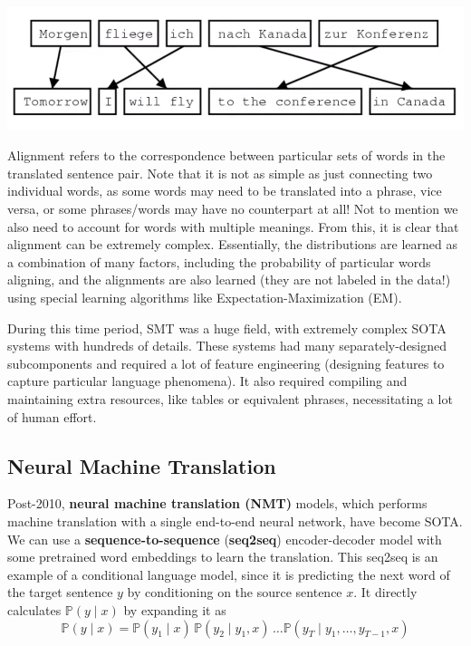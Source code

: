 \documentclass{article}
\begin{document}
    \begin{center}
      \includegraphics[scale=0.3]{img/alignment.png}
    \end{center}

    Alignment refers to the correspondence between particular sets of words in the translated sentence pair. Note that it is not as simple as just connecting two individual words, as some words may need to be translated into a phrase, vice versa, or some phrases/words may have no counterpart at all! Not to mention we also need to account for words with multiple meanings. From this, it is clear that alignment can be extremely complex. Essentially, the distributions are learned as a combination of many factors, including the probability of particular words aligning, and the alignments are also learned (they are not labeled in the data!) using special learning algorithms like Expectation-Maximization (EM). 

    During this time period, SMT was a huge field, with extremely complex SOTA systems with hundreds of details. These systems had many separately-designed subcomponents and required a lot of feature engineering (designing features to capture particular language phenomena). It also required compiling and maintaining extra resources, like tables or equivalent phrases, necessitating a lot of human effort. 

  \subsection{Neural Machine Translation}

    Post-2010, \textbf{neural machine translation (NMT)} models, which performs machine translation with a single end-to-end neural network, have become SOTA. We can use a \textbf{sequence-to-sequence} (\textbf{seq2seq}) encoder-decoder model with some pretrained word embeddings to learn the translation. This seq2seq is an example of a conditional language model, since it is predicting the next word of the target sentence $y$ by conditioning on the source sentence $x$. It directly calculates $\mathbb{P}(y \mid x)$ by expanding it as 
    \[\mathbb{P}(y \mid x) = \mathbb{P}(y_1 \mid x) \, \mathbb{P}(y_2 \mid y_1, x) \, \ldots \mathbb{P}(y_T \mid y_1, \ldots, y_{T-1}, x)\]
\end{document}
